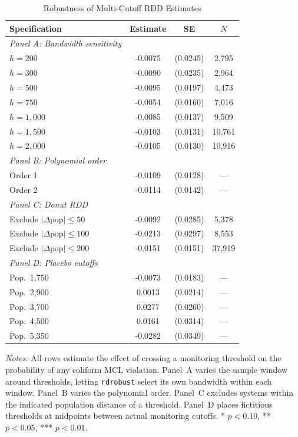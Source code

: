 \begin{table}[H]
\centering
\caption{Robustness of Multi-Cutoff RDD Estimates}
\begin{threeparttable}
\begin{tabular}{lccc}
\toprule
Specification & Estimate & SE & $N$ \\
\midrule
\textit{Panel A: Bandwidth sensitivity} & & & \\
\quad $h=200$ & -0.0075 & (0.0245) & 2,795 \\
\quad $h=300$ & -0.0090 & (0.0235) & 2,964 \\
\quad $h=500$ & -0.0095 & (0.0197) & 4,473 \\
\quad $h=750$ & -0.0054 & (0.0160) & 7,016 \\
\quad $h=1,000$ & -0.0085 & (0.0137) & 9,509 \\
\quad $h=1,500$ & -0.0103 & (0.0131) & 10,761 \\
\quad $h=2,000$ & -0.0105 & (0.0130) & 10,916 \\
\midrule
\textit{Panel B: Polynomial order} & & & \\
\quad Order 1 & -0.0109 & (0.0128) & --- \\
\quad Order 2 & -0.0114 & (0.0142) & --- \\
\midrule
\textit{Panel C: Donut RDD} & & & \\
\quad Exclude $|\Delta\text{pop}| \leq 50$ & -0.0092 & (0.0285) & 5,378 \\
\quad Exclude $|\Delta\text{pop}| \leq 100$ & -0.0213 & (0.0297) & 8,553 \\
\quad Exclude $|\Delta\text{pop}| \leq 200$ & -0.0151 & (0.0151) & 37,919 \\
\midrule
\textit{Panel D: Placebo cutoffs} & & & \\
\quad Pop.~1,750 & -0.0073 & (0.0183) & --- \\
\quad Pop.~2,900 & 0.0013 & (0.0214) & --- \\
\quad Pop.~3,700 & 0.0277 & (0.0260) & --- \\
\quad Pop.~4,500 & 0.0161 & (0.0314) & --- \\
\quad Pop.~5,350 & -0.0282 & (0.0349) & --- \\
\bottomrule
\end{tabular}
\begin{tablenotes}[flushleft]
\small
\item \textit{Notes:} All rows estimate the effect of crossing a monitoring threshold on the probability of any coliform MCL violation. Panel~A varies the sample window around thresholds, letting \texttt{rdrobust} select its own bandwidth within each window. Panel~B varies the polynomial order. Panel~C excludes systems within the indicated population distance of a threshold. Panel~D places fictitious thresholds at midpoints between actual monitoring cutoffs. * $p<0.10$, ** $p<0.05$, *** $p<0.01$.
\end{tablenotes}
\end{threeparttable}
\label{tab:robust}
\end{table}
